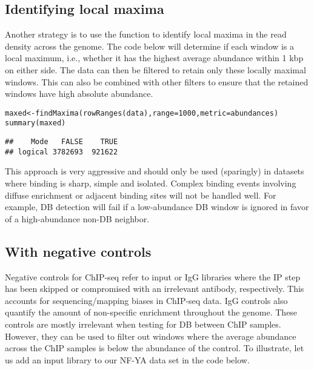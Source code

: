 \documentclass{report}\usepackage[]{graphicx}\usepackage[usenames,dvipsnames]{color}
\newcommand{\hlnum}[1]{\textcolor[rgb]{0.816,0.125,0.439}{#1}}%
\newcommand{\hlstd}[1]{\textcolor[rgb]{0.251,0.251,0.251}{#1}}%
\newcommand{\hlkwb}[1]{\textcolor[rgb]{0,0,0}{#1}}%
\newcommand{\hlkwc}[1]{\textcolor[rgb]{0.251,0.251,0.251}{#1}}%
\newcommand{\hlkwd}[1]{\textcolor[rgb]{0.878,0.439,0.125}{#1}}%
\newenvironment{knitrout}{}{} %
\begin{document}
\subsection{Identifying local maxima}
\label{sec:localmax}
Another strategy is to use the  function to identify local maxima in the read density across the genome.
The code below will determine if each window is a local maximum, i.e., whether it has the highest average abundance within 1 kbp on either side.
The data can then be filtered to retain only these locally maximal windows.
This can also be combined with other filters to ensure that the retained windows have high absolute abundance.

\begin{knitrout}
\color{fgcolor}\begin{kframe}
\begin{alltt}
\hlstd{maxed} \hlkwb{<-} \hlkwd{findMaxima}\hlstd{(}\hlkwd{rowRanges}\hlstd{(data),} \hlkwc{range}\hlstd{=}\hlnum{1000}\hlstd{,} \hlkwc{metric}\hlstd{=abundances)}
\hlkwd{summary}\hlstd{(maxed)}
\end{alltt}
\begin{verbatim}
##    Mode   FALSE    TRUE 
## logical 3782693  921622
\end{verbatim}
\end{kframe}
\end{knitrout}

This approach is very aggressive and should only be used (sparingly) in datasets where binding is sharp, simple and isolated.
Complex binding events involving diffuse enrichment or adjacent binding sites will not be handled well.
For example, DB detection will fail if a low-abundance DB window is ignored in favor of a high-abundance non-DB neighbor.

\subsection{With negative controls}
Negative controls for ChIP-seq refer to input or IgG libraries where the IP step has been skipped or compromised with an irrelevant antibody, respectively. 
This accounts for sequencing/mapping biases in ChIP-seq data. 
IgG controls also quantify the amount of non-specific enrichment throughout the genome. 
These controls are mostly irrelevant when testing for DB between ChIP samples. 
However, they can be used to filter out windows where the average abundance across the ChIP samples is below the abundance of the control. 
To illustrate, let us add an input library to our NF-YA data set in the code below.
\end{document}
